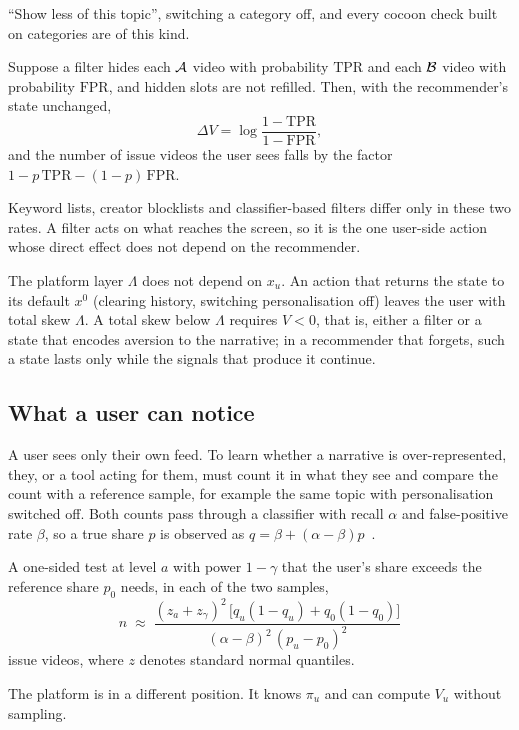 ``Show less of this topic'', switching a category off, and every cocoon check built on categories are of this kind.

\begin{proposition}[Filters]
\label{prop:filter}
Suppose a filter hides each $\mathcal{A}$ video with probability $\mathrm{TPR}$ and each $\mathcal{B}$ video with probability $\mathrm{FPR}$, and hidden slots are not refilled. Then, with the recommender's state unchanged,
\begin{equation}
  \Delta V=\log\frac{1-\mathrm{TPR}}{1-\mathrm{FPR}},
\end{equation}
and the number of issue videos the user sees falls by the factor $1-p\,\mathrm{TPR}-(1-p)\,\mathrm{FPR}$.
\end{proposition}

Keyword lists, creator blocklists and classifier-based filters differ only in these two rates. A filter acts on what reaches the screen, so it is the one user-side action whose direct effect does not depend on the recommender.

\begin{proposition}
\label{prop:reach}
The platform layer $\Lambda$ does not depend on $x_u$. An action that returns the state to its default $x^0$ (clearing history, switching personalisation off) leaves the user with total skew $\Lambda$. A total skew below $\Lambda$ requires $V<0$, that is, either a filter or a state that encodes aversion to the narrative; in a recommender that forgets, such a state lasts only while the signals that produce it continue.
\end{proposition}

\subsection{What a user can notice}
\label{sec:notice}

A user sees only their own feed. To learn whether a narrative is over-represented, they, or a tool acting for them, must count it in what they see and compare the count with a reference sample, for example the same topic with personalisation switched off. Both counts pass through a classifier with recall $\alpha$ and false-positive rate $\beta$, so a true share $p$ is observed as $q=\beta+(\alpha-\beta)p$~\citep{rogan1978prevalence}.

\begin{proposition}
\label{prop:detect}
A one-sided test at level $a$ with power $1-\gamma$ that the user's share exceeds the reference share $p_0$ needs, in each of the two samples,
\begin{equation}
  n\;\approx\;\frac{(z_{a}+z_{\gamma})^2\,\bigl[q_u(1-q_u)+q_0(1-q_0)\bigr]}{(\alpha-\beta)^2\,(p_u-p_0)^2}
  \label{eq:detect}
\end{equation}
issue videos, where $z$ denotes standard normal quantiles.
\end{proposition}

The platform is in a different position. It knows $\pi_u$ and can compute $V_u$ without sampling.
